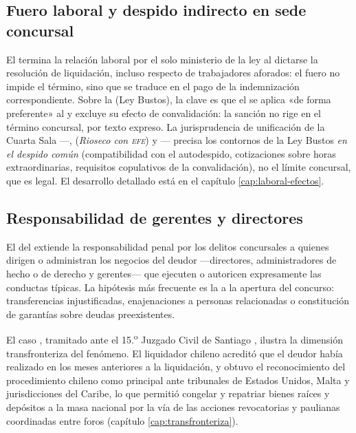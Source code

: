 \bloqueJurisprudencial

\subsection{Fuero laboral y despido indirecto en sede concursal}

El  termina la relación laboral por el solo ministerio de la ley al dictarse la
resolución de liquidación, incluso respecto de trabajadores aforados: el fuero no impide el
término, sino que se traduce en el pago de la indemnización correspondiente. Sobre la
 (Ley Bustos), la clave es que el   se aplica
«de forma preferente» al  y excluye su efecto de convalidación: la sanción no rige en
el término concursal, por texto expreso. La jurisprudencia de unificación de la Cuarta Sala
---,  (\emph{Rioseco con \textsc{efe}}) y 
\parencite{juris-cs-40689-2016, juris-cs-66235-2021, juris-cs-139538-2022}--- precisa los contornos
de la Ley Bustos \emph{en el despido común} (compatibilidad con el autodespido, cotizaciones sobre
horas extraordinarias, requisitos copulativos de la convalidación), no el límite concursal, que es
legal. El desarrollo detallado está en el capítulo \ref{cap:laboral-efectos}.

\subsection{Responsabilidad de gerentes y directores}

El  del \cpen{} extiende la responsabilidad penal por los delitos concursales a
quienes dirigen o administran los negocios del deudor ---directores, administradores de hecho o de
derecho y gerentes--- que ejecuten o autoricen expresamente las conductas típicas. La hipótesis más
frecuente es la  a la apertura del concurso:
transferencias injustificadas, enajenaciones a personas relacionadas o constitución de garantías
sobre deudas preexistentes.

El caso , tramitado ante el 15.\textsuperscript{o}
Juzgado Civil de Santiago \parencite{juris-chang-onix}, ilustra la dimensión transfronteriza del
fenómeno. El liquidador chileno acreditó que el deudor había realizado  en los meses anteriores a la
liquidación, y obtuvo el reconocimiento del procedimiento chileno como principal ante tribunales de
Estados Unidos, Malta y jurisdicciones del Caribe, lo que permitió congelar y repatriar bienes
raíces y depósitos a la masa nacional por la vía de las acciones revocatorias y paulianas coordinadas
entre foros (capítulo \ref{cap:transfronteriza}).

